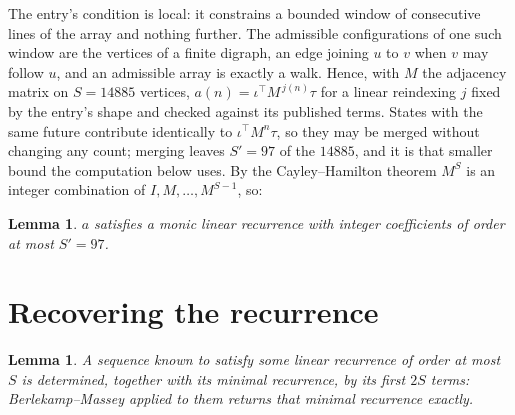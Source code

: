 \documentclass[11pt,a4paper]{article}
\theoremstyle{plain}
\newtheorem{lemma}[theorem]{Lemma}
\theoremstyle{definition}
\begin{document}
The entry's condition is local: it constrains a bounded window of consecutive lines of the
array and nothing further. The admissible configurations of one such window are the vertices
of a finite digraph, an edge joining $u$ to $v$ when $v$ may follow $u$, and an admissible
array is exactly a walk. Hence, with $M$ the adjacency matrix on $S=14885$ vertices,
$a(n)=\iota^{\!\top}M^{\,j(n)}\tau$ for a linear reindexing $j$ fixed by the entry's shape
and checked against its published terms. States with the same future contribute identically to $\iota^{\!\top}M^n\tau$, so they may be merged without changing any count; merging leaves $S'=97$ of the $14885$, and it is that smaller bound the computation below uses. By the Cayley--Hamilton theorem $M^{S}$ is an
integer combination of $I,M,\dots,M^{S-1}$, so:

\begin{lemma}\label{lem:cf}
$a$ satisfies a monic linear recurrence with integer coefficients of order at most
$S'=97$.
\end{lemma}

\section{Recovering the recurrence}

\begin{lemma}\label{lem:bm}
A sequence known to satisfy some linear recurrence of order at most $S$ is determined, together
with its minimal recurrence, by its first $2S$ terms: Berlekamp--Massey applied to them returns
that minimal recurrence exactly.
\end{lemma}
\end{document}
